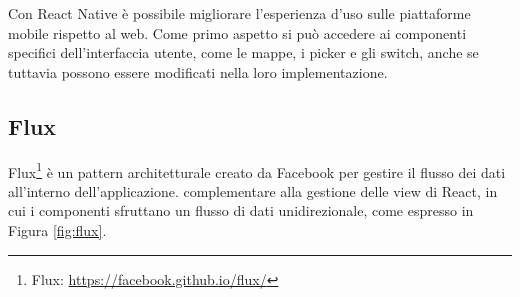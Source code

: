 Con React Native è possibile migliorare l'esperienza d'uso sulle piattaforme mobile rispetto al web. Come primo aspetto si può accedere ai componenti specifici dell'interfaccia utente, come le mappe, i picker e gli switch, anche se tuttavia possono essere modificati nella loro implementazione.

\subsection{Flux}\label{sec:flux}

Flux\footnote{Flux: \url{https://facebook.github.io/flux/}} è un pattern architetturale creato da Facebook per gestire il flusso dei dati all'interno dell'applicazione. \upe complementare alla gestione delle view di React, in cui i componenti sfruttano un flusso di dati unidirezionale, come espresso in Figura \ref{fig:flux}.

